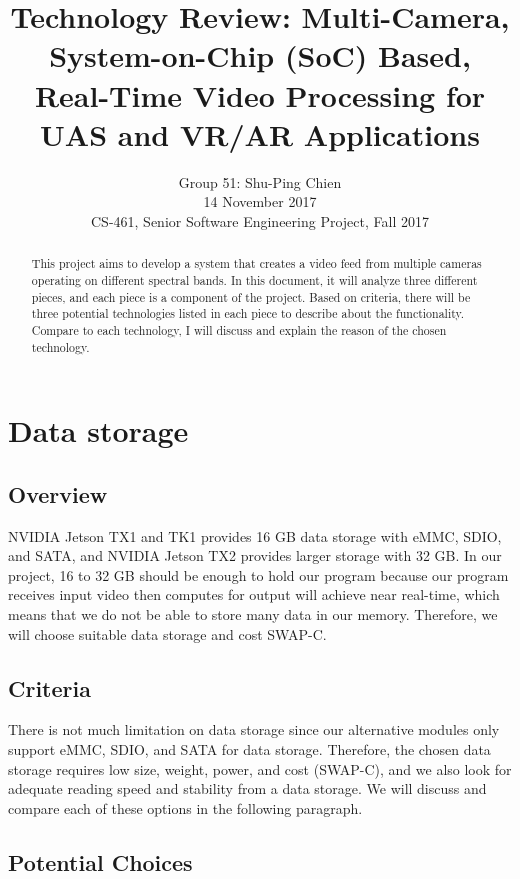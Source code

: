 \documentclass[letterpaper,10pt,serif,draftclsnofoot,onecolumn,compsoc,titlepage]{IEEEtran}
\title{Technology Review: Multi-Camera, System-on-Chip (SoC) Based, Real-Time Video Processing for UAS and VR/AR Applications}
\author{Group 51: Shu-Ping Chien \\ 14 November 2017 \\ CS-461, Senior Software Engineering Project, Fall 2017}
\begin{document}
\begin{titlepage}
\maketitle
\begin{abstract}

This project aims to develop a system that creates a video feed from multiple cameras operating on different spectral bands. In this document, it will analyze three different pieces, and each piece 
is a component of the project. Based on criteria, there will be three potential technologies listed 
in each piece to describe about the functionality. Compare to each technology, I will discuss and 
explain the reason of the chosen technology.

\end{abstract}
\end{titlepage}
\newpage

\tableofcontents
\newpage

\section{Data storage}
\subsection{Overview}
NVIDIA Jetson TX1 and TK1 provides 16 GB data storage with eMMC, SDIO, and SATA, and NVIDIA 
Jetson TX2 provides larger storage with 32 GB. In our project, 16 to 32 GB should be enough to 
hold our program because our program receives input video then computes for output will achieve 
near real-time, which means that we do not be able to store many data in our memory. Therefore, 
we will choose suitable data storage and cost SWAP-C. \\


\subsection{Criteria}
There is not much limitation on data storage since our alternative modules only support eMMC, SDIO, 
and SATA for data storage. Therefore, the chosen data storage requires low size, weight, power, and
 cost (SWAP-C), and we also look for adequate reading speed and stability from a data storage. We 
 will discuss and compare each of these options in the following paragraph. \\

\subsection{Potential Choices}
\end{document}
